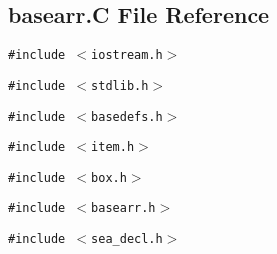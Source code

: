 \subsection{basearr.C File Reference}
\label{basearr.C}
{\tt \#include $<$iostream.h$>$}\par
{\tt \#include $<$stdlib.h$>$}\par
{\tt \#include $<$basedefs.h$>$}\par
{\tt \#include $<$item.h$>$}\par
{\tt \#include $<$box.h$>$}\par
{\tt \#include $<$basearr.h$>$}\par
{\tt \#include $<$sea\_\-decl.h$>$}\par
